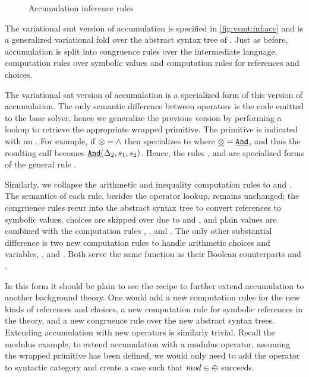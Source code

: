 \label{section:vsmt:accumulation}
%
\begin{figure}
  
  \caption{Accumulation inference rules}%
  \label{fig:vsmt:inf:acc}
\end{figure}
%
%
The variational \ac{smt} version of accumulation is specified in
\autoref{fig:vsmt:inf:acc} and is a generalized variational fold over the
abstract syntax tree of \eIL{}. Just as before, accumulation is split into
congruence rules over the intermediate language, computation rules over symbolic
values and computation rules for references and choices.

The variational \ac{sat} version of accumulation is a specialized form of this
version of accumulation. The only semantic difference between operators is the
code emitted to the base solver, hence we generalize the previous version by
performing a lookup to retrieve the appropriate wrapped primitive. The primitive
is indicated with an . For example, if $\otimes{}{} = \wedge$
then \acBoolS{} specializes to \acAndS{} where $\underline{\otimes{}{}} =
\underline{\texttt{And}}$, and thus the resulting call becomes $\underline{\texttt{And}}(\Delta_{2},
s_1, s_2)$. Hence, the rules \acAndS{}, and \acOrS{} are specialized forms of
the general rule \acBoolS.

Similarly, we collapse the arithmetic and inequality computation rules to
\acArithS{} and \acInEqS{}. The semantics of each rule, besides the operator
lookup, remains unchanged; the congruence rules recur into the abstract syntax
tree to convert references to symbolic values, choices are skipped over due to
\acChc{} and \acChcI{}, and plain values are combined with the computation rules
\acBoolS, \acArithS, and \acInEqS.
%
The only other substantial difference is two new computation rules to handle
arithmetic choices and variables, \acChcI{}, and \acRefI{}. Both serve the same
function as their Boolean counterparts \acChc{} and \acRef{}.

In this form it should be plain to see the recipe to further extend accumulation
to another background theory. One would add a new computation rules for the new
kinds of references and choices, a new computation rule for symbolic references
in the theory, and a new congruence rule over the new abstract syntax trees.
Extending accumulation with new operators is similarly trivial. Recall the
modulus example, to extend accumulation with a modulus operator, assuming the
wrapped primitive has been defined, we would only need to add the operator to
\integerFuncs{} syntactic category and create a case such that $\mathit{mod} \in
\oplus{}{}$ succeeds.



